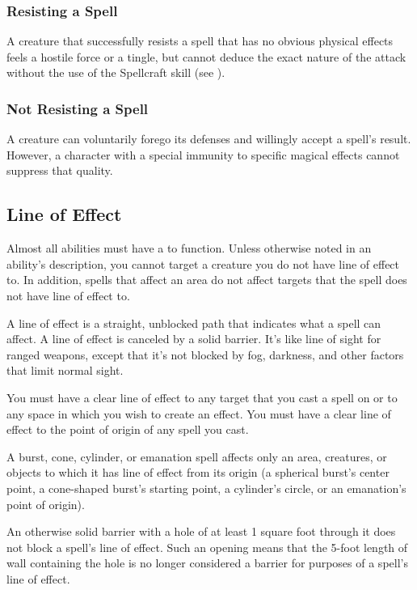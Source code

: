         \subsubsection{Resisting a Spell} A creature that successfully resists a spell that has no obvious physical effects feels a hostile force or a tingle, but cannot deduce the exact nature of the attack without the use of the Spellcraft skill (see ).

        \subsubsection{Not Resisting a Spell} A creature can voluntarily forego its defenses and willingly accept a spell's result.
            However, a character with a special immunity to specific magical effects cannot suppress that quality.

    \subsection{Line of Effect}\label{Line of Effect}

        Almost all abilities must have a  to function.
        Unless otherwise noted in an ability's description, you cannot target a creature you do not have line of effect to.
        In addition, spells that affect an area do not affect targets that the spell does not have line of effect to.

        A line of effect is a straight, unblocked path that indicates what a spell can affect.
        A line of effect is canceled by a solid barrier.
        It's like line of sight for ranged weapons, except that it's not blocked by fog, darkness, and other factors that limit normal sight.

        You must have a clear line of effect to any target that you cast a spell on or to any space in which you wish to create an effect.
        You must have a clear line of effect to the point of origin of any spell you cast.

        A burst, cone, cylinder, or emanation spell affects only an area, creatures, or objects to which it has line of effect from its origin (a spherical burst's center point, a cone-shaped burst's starting point, a cylinder's circle, or an emanation's point of origin).

        An otherwise solid barrier with a hole of at least 1 square foot through it does not block a spell's line of effect.
        Such an opening means that the 5-foot length of wall containing the hole is no longer considered a barrier for purposes of a spell's line of effect.

